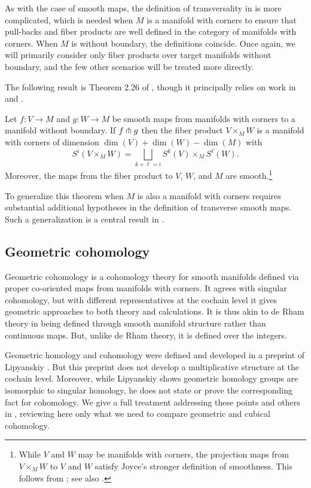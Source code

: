 As with the case of smooth maps, the definition of transversality in \cite{Joy12} is more complicated, which is needed when $M$ is a manifold with corners to ensure that pull-backs and fiber products are well defined in the category of manifolds with corners.
When $M$ is without boundary, the definitions coincide.
Once again, we will primarily consider only fiber products over target manifolds without boundary, and the few other scenarios will be treated more directly.


The following result is Theorem 2.26 of \cite{medina2022foundations}, though it principally relies on work in \cite{Joy12} and \cite{MaDo92}.

\begin{theorem}\label{pullback}
	Let $f \colon V \to M$ and $g \colon W \to M$ be smooth maps from manifolds with corners to a manifold without boundary.
	If $f \pitchfork g$ then the fiber product $V \times_M W$ is a manifold with corners of dimension $\dim(V) + \dim(W) - \dim(M)$ with
	\[
	S^i(V \times_M W) = \bigsqcup_{k + \ell = i} S^k(V) \times_M S^\ell(W).
	\]
	Moreover, the maps from the fiber product to $V$, $W$, and $M$ are smooth.\footnote{While $V$ and $W$ may be manifolds with corners, the projection maps from $V \times_M W$ to $V$ and $W$ satisfy Joyce's stronger definition of smoothness.
		This follows from \cite[Theorem 6.4]{Joy12}; see also \cite[Theorem 2.26]{medina2022foundations}.}
\end{theorem}

To generalize this theorem when $M$ is also a manifold with corners requires substantial additional hypotheses in the definition of transverse smooth maps.
Such a generalization is a central result in \cite{Joy12}.

\subsection{Geometric cohomology}

Geometric cohomology is a cohomology theory for smooth manifolds defined via proper co-oriented maps from manifolds with corners.
It agrees with singular cohomology, but with different representatives at the cochain level it gives geometric approaches to both theory and calculations.
It is thus akin to de Rham theory in being defined through smooth manifold structure rather than continuous maps.
But, unlike de Rham theory, it is defined over the integers.

Geometric homology and cohomology were defined and developed in a preprint of Lipyanskiy \cite{Lipy14}.
But this preprint does not develop a multiplicative structure at the cochain level.
Moreover, while Lipyanskiy shows geometric homology groups are isomorphic to singular homology, he does not state or prove the corresponding fact for cohomology.
We give a full treatment addressing these points and others in \cite{medina2022foundations}, reviewing here only what we need to compare geometric and cubical cohomology.

